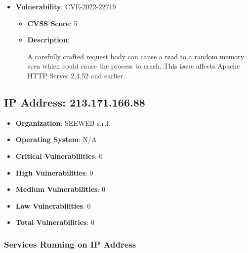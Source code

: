 \documentclass{article}
\begin{document}
\begin{itemize}
        \item \textbf{Vulnerability}: CVE-2022-22719
        \begin{itemize}
            \item \textbf{CVSS Score}:  5 
            \item \textbf{Description}:
            \parbox[t]{0.9\linewidth}{
                \ttfamily A carefully crafted request body can cause a read to a random memory area which could cause the process to crash. This issue affects Apache HTTP Server 2.4.52 and earlier.
            }
        \end{itemize}
    
\end{itemize}




\clearpage



\subsection{IP Address: 213.171.166.88}

\begin{itemize}
    \item \textbf{Organization}: SEEWEB s.r.l.
    \item \textbf{Operating System}:  N/A 
    \item \textbf{Critical Vulnerabilities}: 0
    \item \textbf{High Vulnerabilities}: 0
    \item \textbf{Medium Vulnerabilities}: 0
    \item \textbf{Low Vulnerabilities}: 0
    \item \textbf{Total Vulnerabilities}: 0
\end{itemize}

\subsubsection*{Services Running on IP Address}
\end{document}
